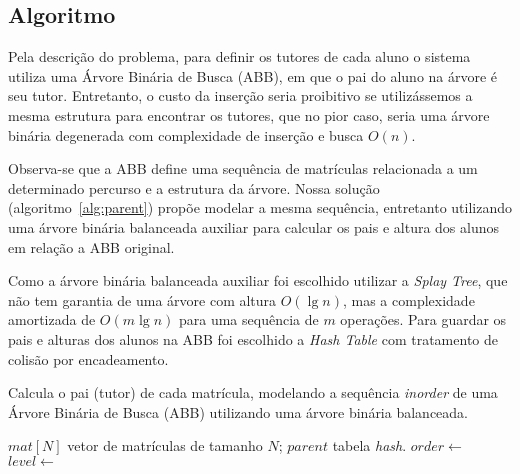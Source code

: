 \subsection{Algoritmo} \label{sec:algo}
Pela descrição do problema, para definir os tutores de cada aluno o sistema
utiliza uma Árvore Binária de Busca (ABB), em que o pai do aluno na árvore é seu
tutor. Entretanto, o custo da inserção seria proibitivo se utilizássemos a mesma
estrutura para encontrar os tutores, que no pior caso, seria uma árvore
binária degenerada com complexidade de inserção e busca $O(n)$.

Observa-se que a ABB define uma sequência de matrículas
relacionada a um determinado percurso e a estrutura da árvore. Nossa solução (algoritmo~\ref{alg:parent}) propõe 
modelar a mesma sequência, entretanto utilizando uma árvore binária balanceada auxiliar
para calcular os pais e altura dos alunos em relação a ABB original.

Como a árvore binária balanceada auxiliar foi escolhido utilizar a \textit{Splay Tree}, que não tem garantia de uma árvore com altura $O(\lg n)$, mas a complexidade amortizada de $O(m \lg n)$ para uma sequência de $m$ operações. Para guardar os pais e alturas dos alunos na ABB foi escolhido a \textit{Hash Table} com tratamento de colisão por encadeamento.

\begin{algorithm}[ht]
  \small
  \caption{Calcula o pai (tutor) de cada matrícula, modelando a sequência \textit{inorder} de uma Árvore Binária de Busca (ABB) utilizando uma árvore binária balanceada.}
  \label{alg:parent}
  \begin{algorithmic}[1]
    \Require $mat[N]$ vetor de matrículas de tamanho $N$; $parent$ tabela \textit{hash}.
    \State $order \gets$ 
    \State $level \gets$ 

    \Statex

    \State {}
    \EndIf {}
    \Statex
    
    \State {}
    
    \EndFor
    \EndProcedure
  \end{algorithmic}
\end{algorithm}

